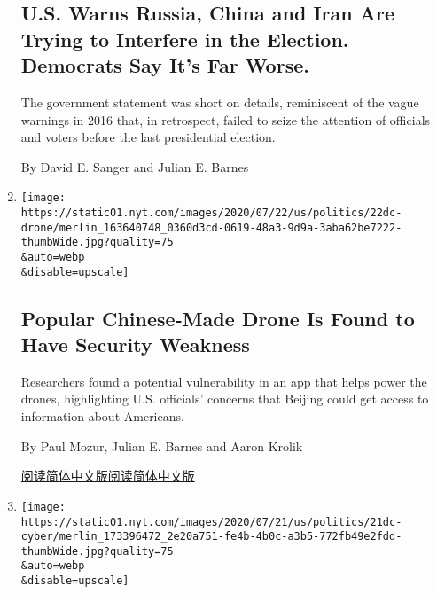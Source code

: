 \begin{enumerate}
  \hypertarget{us-warns-russia-china-and-iran-are-trying-to-interfere-in-the-election-democrats-say-its-far-worse}{%
  \subsection{U.S. Warns Russia, China and Iran Are Trying to Interfere
  in the Election. Democrats Say It's Far
  Worse.}\label{us-warns-russia-china-and-iran-are-trying-to-interfere-in-the-election-democrats-say-its-far-worse}}

  The government statement was short on details, reminiscent of the
  vague warnings in 2016 that, in retrospect, failed to seize the
  attention of officials and voters before the last presidential
  election.

  By David E. Sanger and Julian E. Barnes
\item
  \href{/2020/07/23/us/politics/dji-drones-security-vulnerability.html}{}

  \texttt{[image: https://static01.nyt.com/images/2020/07/22/us/politics/22dc-drone/merlin\_163640748\_0360d3cd-0619-48a3-9d9a-3aba62be7222-thumbWide.jpg?quality=75\\\&auto=webp\\\&disable=upscale]}

  \hypertarget{popular-chinese-made-drone-is-found-to-have-security-weakness}{%
  \subsection{Popular Chinese-Made Drone Is Found to Have Security
  Weakness}\label{popular-chinese-made-drone-is-found-to-have-security-weakness}}

  Researchers found a potential vulnerability in an app that helps power
  the drones, highlighting U.S. officials' concerns that Beijing could
  get access to information about Americans.

  By Paul Mozur, Julian E. Barnes and Aaron Krolik

  \href{https://cn.nytimes.com/usa/20200724/dji-drones-security-vulnerability/}{阅读简体中文版}\href{https://cn.nytimes.com/usa/20200724/dji-drones-security-vulnerability/}{阅读简体中文版}
\item
  \href{/2020/07/21/us/politics/china-hacking-coronavirus-vaccine.html}{}

  \texttt{[image: https://static01.nyt.com/images/2020/07/21/us/politics/21dc-cyber/merlin\_173396472\_2e20a751-fe4b-4b0c-a3b5-772fb49e2fdd-thumbWide.jpg?quality=75\\\&auto=webp\\\&disable=upscale]}

  \hypertarget{us-accuses-hackers-of-trying-to-steal-coronavirus-vaccine-data-for-china}{%
}
\end{enumerate}
